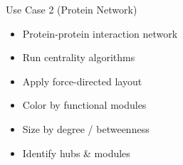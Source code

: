 \begin{frame}{Use Case 2 (Protein Network)}
	\begin{itemize}
		\item Protein-protein interaction network
		\item Run centrality algorithms
		\item Apply force-directed layout
		\item Color by functional modules
		\item Size by degree / betweenness
		\item Identify hubs \& modules
	\end{itemize}
\end{frame}
